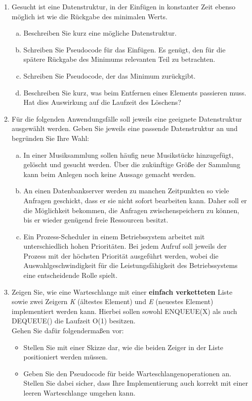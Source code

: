 \documentclass{scrartcl}
\begin{document}
\begin{enumerate}[(1)]
\item
Gesucht ist eine Datenstruktur, in der Einf\"ugen in konstanter Zeit ebenso m\"oglich ist wie die R\"uckgabe des minimalen Werts.
\begin{enumerate}[(a)]
\item Beschreiben Sie kurz eine m\"ogliche Datenstruktur.
\item Schreiben Sie Pseudocode f\"ur das Einf\"ugen. Es gen\"ugt, den f\"ur die sp\"atere R\"uckgabe des Minimums relevanten Teil zu betrachten.
\item Schreiben Sie Pseudocode, der das Minimum zur\"uckgibt.
\item Beschreiben Sie kurz, was beim Entfernen eines Elements passieren muss. Hat dies Auswirkung auf die Laufzeit des L\"oschens?
\end{enumerate}

\item Für die folgenden Anwendungsfälle soll jeweils eine geeignete Datenstruktur ausgewählt werden. Geben Sie jeweils eine passende Datenstruktur an und begründen Sie Ihre Wahl:
\begin{enumerate}[(a)]
\item In einer Musiksammlung sollen häufig neue Musikstücke hinzugefügt, gelöscht und gesucht werden. Über die zukünftige Größe der Sammlung kann beim Anlegen noch keine Aussage gemacht werden.
\item An einen Datenbankserver werden zu manchen Zeitpunkten so viele Anfragen geschickt, dass er sie nicht sofort bearbeiten kann. Daher soll er die Möglichkeit bekommen, die Anfragen zwischenspeichern zu können, bis er wieder genügend freie Ressourcen besitzt.
\item Ein Prozess-Scheduler in einem Betriebssystem arbeitet mit unterschiedlich hohen Prioritäten. Bei jedem Aufruf soll jeweils der Prozess mit der höchsten Priorität ausgeführt werden, wobei die Auswahlgeschwindigkeit für die Leistungsfähigkeit des Betriebssystems eine entscheidende Rolle spielt.
\end{enumerate}

\item Zeigen Sie, wie eine Warteschlange mit einer \textbf{einfach verketteten} Liste sowie zwei Zeigern \textit{K} (ältestes Element) und \textit{E} (neuestes Element) implementiert werden kann. Hierbei sollen sowohl ENQUEUE(X) als auch DEQUEUE() die Laufzeit O(1) besitzen.\\
Gehen Sie dafür folgendermaßen vor:\\
\begin{itemize}
	\item Stellen Sie mit einer Skizze dar, wie die beiden Zeiger in der Liste positioniert werden müssen.
	\item Geben Sie den Pseudocode für beide Warteschlangenoperationen an. Stellen  Sie dabei sicher, dass Ihre Implementierung auch korrekt mit einer leeren Warteschlange umgehen kann.
\end{itemize}

\end{enumerate}
\end{document}
